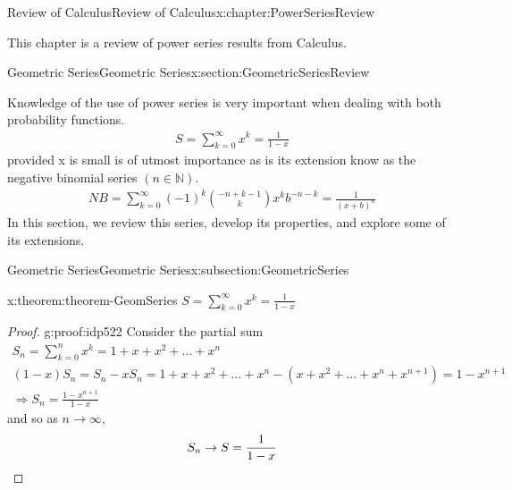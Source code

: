 \documentclass[oneside,10pt,]{book}
\newcommand{\qedhere}{\relax}
\numberwithin{equation}{section}
\begin{document}
\begin{chapterptx}{Review of Calculus}{}{Review of Calculus}{}{}{x:chapter:PowerSeriesReview}
\begin{introduction}{}%
This chapter is a review of power series results from Calculus.%
\end{introduction}%
%
%
\typeout{************************************************}
\typeout{************************************************}
%
\begin{sectionptx}{Geometric Series}{}{Geometric Series}{}{}{x:section:GeometricSeriesReview}
\begin{introduction}{}%
Knowledge of the use of power series is very important when dealing with both probability functions.%
%
\begin{gather*}
S = \sum_{k=0}^{\infty} {x^k} = \frac{1}{1-x}
\end{gather*}
provided x is small is of utmost importance as is its extension know as the negative binomial series \(( n \in \mathbb{N} )\).%
%
\begin{gather*}
NB = \sum_{k=0}^{\infty} (-1)^k \binom{-n + k - 1}{k} {x^k b^{-n-k}} = \frac{1}{(x+b)^n}
\end{gather*}
In this section, we review this series, develop its properties, and explore some of its extensions.%
\end{introduction}%
%
%
\typeout{************************************************}
\typeout{************************************************}
%
\begin{subsectionptx}{Geometric Series}{}{Geometric Series}{}{}{x:subsection:GeometricSeries}
\begin{theorem}{}{}{x:theorem:theorem-GeomSeries}%
\(S = \sum_{k=0}^{\infty} {x^k} = \frac{1}{1-x}\)\end{theorem}
\begin{proof}{}{g:proof:idp522}
Consider the partial sum%
%
\begin{gather*}
S_n = \sum_{k=0}^{n} {x^k} = 1 + x + x^2 + ... + x^n \\
(1-x)S_n = S_n - x S_n = 1 + x + x^2 + ... + x^n - (x + x^2 + ... + x^n + x^{n+1}) = 1 - x^{n+1} \\
\Rightarrow S_n = \frac{1-x^{n+1}}{1-x} 
\end{gather*}
and so as \(n \rightarrow \infty \),%
%
\begin{gather*}
S_n \rightarrow S = \frac{1}{1-x} \qedhere
\end{gather*}

\end{proof}
\end{subsectionptx}
\end{sectionptx}
\end{chapterptx}
\end{document}
